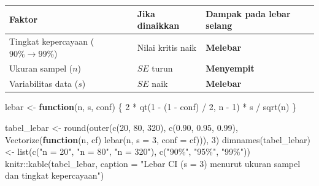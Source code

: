 \documentclass[
  indonesian,
  letterpaper,
]{book}
\newenvironment{Shaded}{\begin{snugshade}}{\end{snugshade}}
\newcommand{\AttributeTok}[1]{\textcolor[rgb]{0.40,0.45,0.13}{#1}}
\newcommand{\ControlFlowTok}[1]{\textcolor[rgb]{0.00,0.23,0.31}{\textbf{#1}}}
\newcommand{\DecValTok}[1]{\textcolor[rgb]{0.68,0.00,0.00}{#1}}
\newcommand{\FloatTok}[1]{\textcolor[rgb]{0.68,0.00,0.00}{#1}}
\newcommand{\FunctionTok}[1]{\textcolor[rgb]{0.28,0.35,0.67}{#1}}
\newcommand{\NormalTok}[1]{\textcolor[rgb]{0.00,0.23,0.31}{#1}}
\newcommand{\OtherTok}[1]{\textcolor[rgb]{0.00,0.23,0.31}{#1}}
\newcommand{\SpecialCharTok}[1]{\textcolor[rgb]{0.37,0.37,0.37}{#1}}
\newcommand{\StringTok}[1]{\textcolor[rgb]{0.13,0.47,0.30}{#1}}
\newcounter{none} %
\begin{document}
{\def\LTcaptype{none} %
\begin{longtable}[]{@{}
  >{\raggedright\arraybackslash}p{}
  >{\raggedright\arraybackslash}p{}
  >{\raggedright\arraybackslash}p{}@{}}
\toprule\noalign{}
\begin{minipage}[b]{\linewidth}\raggedright
Faktor
\end{minipage} & \begin{minipage}[b]{\linewidth}\raggedright
Jika dinaikkan
\end{minipage} & \begin{minipage}[b]{\linewidth}\raggedright
Dampak pada lebar selang
\end{minipage} \\
\midrule\noalign{}
\endhead
\bottomrule\noalign{}
\endlastfoot
Tingkat kepercayaan (\(90\% \rightarrow 99\%\)) & Nilai kritis naik &
\textbf{Melebar} \\
Ukuran sampel (\(n\)) & \(SE\) turun & \textbf{Menyempit} \\
Variabilitas data (\(s\)) & \(SE\) naik & \textbf{Melebar} \\
\end{longtable}
}

\begin{Shaded}
\begin{Highlighting}[]
\NormalTok{lebar }\OtherTok{\textless{}{-}} \ControlFlowTok{function}\NormalTok{(n, s, conf) \{}
  \DecValTok{2} \SpecialCharTok{*} \FunctionTok{qt}\NormalTok{(}\DecValTok{1} \SpecialCharTok{{-}}\NormalTok{ (}\DecValTok{1} \SpecialCharTok{{-}}\NormalTok{ conf) }\SpecialCharTok{/} \DecValTok{2}\NormalTok{, n }\SpecialCharTok{{-}} \DecValTok{1}\NormalTok{) }\SpecialCharTok{*}\NormalTok{ s }\SpecialCharTok{/} \FunctionTok{sqrt}\NormalTok{(n)}
\NormalTok{\}}

\NormalTok{tabel\_lebar }\OtherTok{\textless{}{-}} \FunctionTok{round}\NormalTok{(}\FunctionTok{outer}\NormalTok{(}\FunctionTok{c}\NormalTok{(}\DecValTok{20}\NormalTok{, }\DecValTok{80}\NormalTok{, }\DecValTok{320}\NormalTok{), }\FunctionTok{c}\NormalTok{(}\FloatTok{0.90}\NormalTok{, }\FloatTok{0.95}\NormalTok{, }\FloatTok{0.99}\NormalTok{),}
                           \FunctionTok{Vectorize}\NormalTok{(}\ControlFlowTok{function}\NormalTok{(n, cf) }\FunctionTok{lebar}\NormalTok{(n, }\AttributeTok{s =} \DecValTok{3}\NormalTok{, }\AttributeTok{conf =}\NormalTok{ cf))), }\DecValTok{3}\NormalTok{)}
\FunctionTok{dimnames}\NormalTok{(tabel\_lebar) }\OtherTok{\textless{}{-}} \FunctionTok{list}\NormalTok{(}\FunctionTok{c}\NormalTok{(}\StringTok{"n = 20"}\NormalTok{, }\StringTok{"n = 80"}\NormalTok{, }\StringTok{"n = 320"}\NormalTok{),}
                              \FunctionTok{c}\NormalTok{(}\StringTok{"90\%"}\NormalTok{, }\StringTok{"95\%"}\NormalTok{, }\StringTok{"99\%"}\NormalTok{))}
\NormalTok{knitr}\SpecialCharTok{::}\FunctionTok{kable}\NormalTok{(tabel\_lebar, }\AttributeTok{caption =} \StringTok{"Lebar CI (s = 3) menurut ukuran sampel dan tingkat kepercayaan"}\NormalTok{)}
\end{Highlighting}
\end{Shaded}
\end{document}
